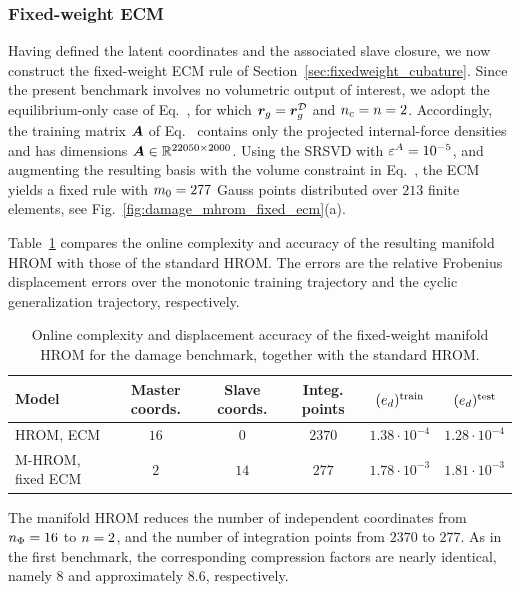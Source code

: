 \documentclass[preprint,10pt]{elsarticle}  %
\begin{document}
\subsubsection{Fixed-weight ECM}
\label{sec:fixedECM2}
%
% 


 Having defined the latent coordinates and the associated slave closure,
we now construct the fixed-weight ECM rule of
Section~\ref{sec:fixedweight_cubature}.  Since the present benchmark involves no volumetric output of interest,
we adopt the equilibrium-only case of Eq.~, for
which \(\bm{r}_{g}=\bm{r}^{\mathcal{D}}_{g}\) and \(n_c=n=2\). Accordingly, the
training matrix \(\bm{A}\) of Eq.~ contains
only the projected internal-force densities and has dimensions
\(\bm{A}\in\mathbb{R}^{22050\times2000}\).  Using the SRSVD with
\(\varepsilon^A=10^{-5}\), and augmenting the resulting basis with the volume
constraint in Eq.~, the ECM yields a
fixed rule with \(m_0=277\) Gauss points distributed over \(213\)
finite elements, see Fig.~\ref{fig:damage_mhrom_fixed_ecm}(a).

Table~\ref{tab:online_fixed_manifold_damage} compares the online
complexity and accuracy of the resulting manifold HROM with those of
the standard HROM. The errors are the relative Frobenius displacement
errors over the monotonic training trajectory and the cyclic
generalization trajectory, respectively.

\begin{table}[!ht]
\centering
\caption{Online complexity and displacement accuracy of the fixed-weight
manifold HROM for the damage benchmark, together with the standard
HROM.}
\label{tab:online_fixed_manifold_damage}
\begin{tabular}{lccccc}
\toprule
Model
& Master coords.
& Slave coords.
& Integ. points
& \((e_d)^{\mathrm{train}}\)
& \((e_d)^{\mathrm{test}}\) \\
\midrule
HROM, ECM
& \(16\) & \(0\) & \(2370\)
& \(1.38\cdot10^{-4}\)
& \(1.28\cdot10^{-4}\) \\
M-HROM, fixed ECM
& \(2\) & \(14\) & \(277\)
& \(1.78\cdot10^{-3}\)
& \(1.81\cdot10^{-3}\) \\
\bottomrule
\end{tabular}
\end{table}

The manifold HROM reduces the number of independent coordinates from
\(n_{\Phi}=16\) to \(n=2\), and the number of integration points from
\(2370\) to \(277\). As in the first benchmark, the corresponding
compression factors are nearly identical, namely \(8\) and
approximately \(8.6\), respectively.
\end{document}
